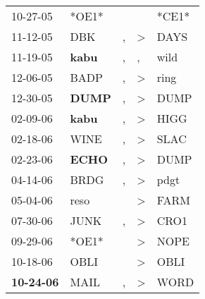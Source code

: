 \begin{supertabular}{p{0.07\textwidth}p{0.06\textwidth}p{0.02\textwidth}p{0.02\textwidth}p{0.06\textwidth}}
          10-27-05\textsuperscript{} &                            *OE1* &                  &                  &                            *CE1* \\
          11-12-05\textsuperscript{} &            DBK\textsuperscript{} &                , &     \textgreater &           DAYS\textsuperscript{} \\
          11-19-05\textsuperscript{} &  \textbf{kabu\textsuperscript{}} &                , &                , &           wild\textsuperscript{} \\
          12-06-05\textsuperscript{} &           BADP\textsuperscript{} &                , &     \textgreater &           ring\textsuperscript{} \\
          12-30-05\textsuperscript{} &  \textbf{DUMP\textsuperscript{}} &                , &     \textgreater &           DUMP\textsuperscript{} \\
          02-09-06\textsuperscript{} &  \textbf{kabu\textsuperscript{}} &                , &     \textgreater &           HIGG\textsuperscript{} \\
          02-18-06\textsuperscript{} &           WINE\textsuperscript{} &                , &     \textgreater &           SLAC\textsuperscript{} \\
          02-23-06\textsuperscript{} &  \textbf{ECHO\textsuperscript{}} &                , &     \textgreater &           DUMP\textsuperscript{} \\
          04-14-06\textsuperscript{} &           BRDG\textsuperscript{} &                , &     \textgreater &           pdgt\textsuperscript{} \\
          05-04-06\textsuperscript{} &           reso\textsuperscript{} &                  &     \textgreater &           FARM\textsuperscript{} \\
          07-30-06\textsuperscript{} &           JUNK\textsuperscript{} &                , &     \textgreater &           CRO1\textsuperscript{} \\
          09-29-06\textsuperscript{} &                            *OE1* &                  &     \textgreater &           NOPE\textsuperscript{} \\
          10-18-06\textsuperscript{} &           OBLI\textsuperscript{} &                  &     \textgreater &           OBLI\textsuperscript{} \\
 \textbf{10-24-06\textsuperscript{}} &           MAIL\textsuperscript{} &                , &     \textgreater &           WORD\textsuperscript{} \\

\end{supertabular}
